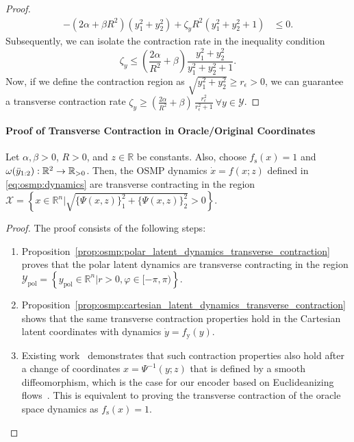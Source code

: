 \begin{proof}
\begin{equation}
\begin{split}
        -(2\alpha + \beta R^2) (y_1^2 + y_2^2) + \zeta_y R^2 (y_1^2 + y_2^2 + 1)& \leq 0.
    \end{split}
    \end{equation}
    Subsequently, we can isolate the contraction rate in the inequality condition
    \begin{equation}
        \zeta_y \leq \left ( \frac{2 \alpha}{R^2} + \beta \right ) \frac{y_1^2+y_2^2}{y_1^2 + y_2^2 + 1}.
    \end{equation}
    Now, if we define the contraction region as $\sqrt{y_1^2+y_2^2} \geq r_\epsilon > 0$, we can guarantee a transverse contraction rate $\zeta_y \geq \left (\frac{2\alpha}{R^2} + \beta \right ) \, \frac{r_\epsilon^2}{r_\epsilon^2 + 1} \: \forall y \in \mathcal{Y}$.
\end{proof}

\paragraph{Proof of Transverse Contraction in Oracle/Original Coordinates}
\begin{theorem}\label{theorem:osmp:transverse_contraction}
    Let $\alpha, \beta > 0$, $R > 0$, and $z \in \mathbb{R}$ be constants.
    Also, choose $f_\mathrm{s}(x) = 1$ and $\omega(\Bar{y}_{1:2}): \mathbb{R}^2 \to \mathbb{R}_{>0}$.
    Then, the \gls{OSMP} dynamics $\dot{x} = f(x;z)$ defined in \eqref{eq:osmp:dynamics} are transverse contracting 
    in the region $\mathcal{X} = \left \{ x \in \mathbb{R}^n | \sqrt{\{ \Psi(x,z) \}_1^2 + \{ \Psi(x,z) \}_2^2} > 0 \right \}$.
\end{theorem}
\begin{proof}
    The proof consists of the following steps:
    \begin{enumerate}
        \item Proposition~\ref{prop:osmp:polar_latent_dynamics_transverse_contraction} proves that the polar latent dynamics are transverse contracting in the region $\mathcal{Y}_\mathrm{pol} = \left \{ y_\mathrm{pol} \in \mathbb{R}^n | r > 0, \varphi \in [-\pi, \pi) \right \}$.
        \item Proposition~\ref{prop:osmp:cartesian_latent_dynamics_transverse_contraction} shows that the same transverse contraction properties hold in the Cartesian latent coordinates with dynamics $\dot{y} = f_\mathrm{y}(y)$.
        \item Existing work~\citep{manchester2017control, mohammadi2024neural, jaffe2024learning} demonstrates that such contraction properties also hold after a change of coordinates $x = \Psi^{-1}(y;z)$ that is defined by a smooth diffeomorphism, which is the case for our encoder based on Euclideanizing flows~\citep{rana2020euclideanizing}. This is equivalent to proving the transverse contraction of the oracle space dynamics as $f_\mathrm{s}(x) = 1$.
    \end{enumerate}
\end{proof}

